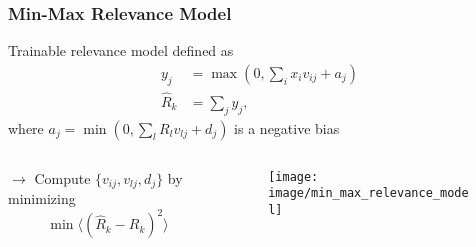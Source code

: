\documentclass{beamer}
\begin{document}
\iffalse
\begin{frame}
\frametitle{Relevance Model}
\vspace{0.25cm}
In deep architectures as in figure 3 a mapping between two layers may be unknown, even if it exists
\begin{block}{Definition 1}
A relevance model is a function that maps a set of neuron activations at a given layer to the relevance of a neuron in a higher layer, and whose output can be redistributed onto its input variables.
\end{block}

\begin{figure}
\label{fig1}
\texttt{[image: image/example\_deep\_network\_one]}
\end{figure}
\vspace{-0.5cm}
\end{frame}
\fi

\begin{frame}
\frametitle{Min-Max Relevance Model}
\vspace{0.4cm}
Trainable relevance model defined as
\begin{align*}
y_j &= \max(0,\sum_ix_iv_{ij} + a_j)\\
\hat{R}_k &= \sum_j y_j,
\end{align*}
where $a_j = \min(0,\sum_l R_l v_{lj} + d_j)$ is a negative bias
\vspace{-0.25cm}


 \begin{columns}
          \begin{column}{5cm}
          		$\rightarrow$ Compute $\{v_{ij}, v_{lj},d_j\}$ by minimizing 
			\begin{equation*}
			\min\langle (\hat{R}_k-R_k)^2 \rangle
			\end{equation*}
            \end{column} 
            \begin{column}{6cm}
			\begin{figure}
			\label{fig1}
			\texttt{[image: image/min\_max\_relevance\_model]}
			\end{figure}
	\end{column}
\end{columns} 

\end{frame}
\end{document}
